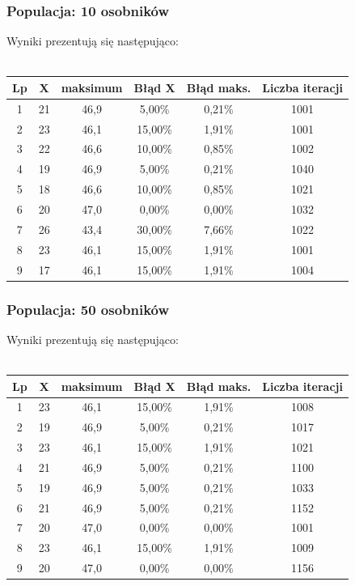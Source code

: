 \documentclass[a4paper,11pt]{article}
\begin{document}
			\subsubsection{Populacja: 10 osobników}
				Wyniki prezentują się następująco:\\~\\
				\begin{tabular}{|c|c|c|c|c|c|}
					\hline 
					Lp & X & maksimum & Błąd X & Błąd maks. & Liczba iteracji\\\hline
					1 & 21 & 46,9 & 5,00\% &0,21\%  &1001\\\hline
					2 & 23 & 46,1 & 15,00\% & 1,91\% &1001 \\\hline
					3 & 22 & 46,6 & 10,00\% &0,85\% &1002 \\\hline
					4 & 19 & 46,9 & 5,00\% & 0,21\%&1040 \\\hline
					5 & 18 & 46,6 & 10,00\% & 0,85\%&1021 \\\hline
					6 & 20 & 47,0 & 0,00\% & 0,00\%& 1032 \\\hline
					7 & 26 & 43,4 & 30,00\% & 7,66\%& 1022 \\\hline
					8 & 23 & 46,1 & 15,00\% & 1,91\%& 1001 \\\hline
					9  & 17 & 46,1&15,00\%  & 1,91\%& 1004 \\\hline
				\end{tabular} 
			\subsubsection{Populacja: 50 osobników}
				Wyniki prezentują się następująco:\\~\\
				\begin{tabular}{|c|c|c|c|c|c|}
					\hline 
					Lp & X & maksimum & Błąd X & Błąd maks. & Liczba iteracji \\
					\hline
					1 &23 & 46,1 & 15,00\% & 1,91\%& 1008\\\hline
					2 & 19 & 46,9 & 5,00\% & 0,21\%& 1017\\\hline
					3 & 23 & 46,1 & 15,00\% & 1,91\% & 1021 \\\hline
					4 & 21 & 46,9 & 5,00\% & 0,21\% & 1100\\\hline
					5 & 19 & 46,9 & 5,00\% & 0,21\% & 1033\\\hline
					6 & 21 & 46,9 & 5,00\% & 0,21\% & 1152\\\hline
					7 & 20 & 47,0 & 0,00\% & 0,00\% & 1001\\\hline
					8 & 23 & 46,1 & 15,00\% &1,91\%  & 1009\\\hline
					9 & 20 & 47,0 & 0,00\% & 0,00\% & 1156 \\\hline
				\end{tabular} 
\end{document}
